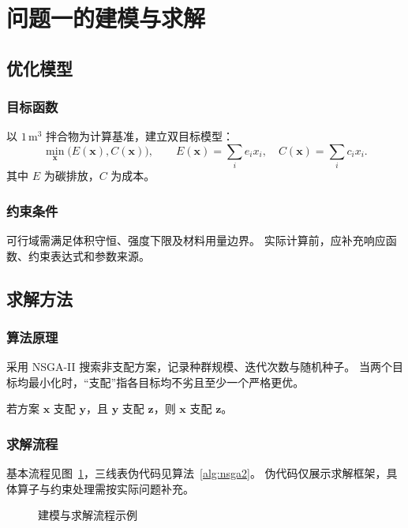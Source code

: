 \section{问题一的建模与求解}
\label{sec:problem1}
\subsection{优化模型}
\subsubsection{目标函数}
以 $1\,\mathrm{m^3}$ 拌合物为计算基准，建立双目标模型：
\begin{equation}
  \min_{\boldsymbol{x}}\bigl(E(\boldsymbol{x}),C(\boldsymbol{x})\bigr),
  \qquad E(\boldsymbol{x})=\sum_i e_i x_i,\quad
  C(\boldsymbol{x})=\sum_i c_i x_i.
  \label{eq:objectives}
\end{equation}
其中 $E$ 为碳排放，$C$ 为成本。

\subsubsection{约束条件}
可行域需满足体积守恒、强度下限及材料用量边界。
实际计算前，应补充响应函数、约束表达式和参数来源。

\subsection{求解方法}
\subsubsection{算法原理}
采用 NSGA-II 搜索非支配方案\citep{deb2002}，记录种群规模、迭代次数与随机种子。
当两个目标均最小化时，“支配”指各目标均不劣且至少一个严格更优。
\begin{theorem}[支配关系的传递性]
  若方案 $\boldsymbol{x}$ 支配 $\boldsymbol{y}$，且 $\boldsymbol{y}$ 支配
  $\boldsymbol{z}$，则 $\boldsymbol{x}$ 支配 $\boldsymbol{z}$。
\end{theorem}

\subsubsection{求解流程}
基本流程见图~\ref{fig:framework}，三线表伪代码见算法~\ref{alg:nsga2}。
伪代码仅展示求解框架，具体算子与约束处理需按实际问题补充。
\begin{figure}[htbp]
  \centering
  
  \caption{建模与求解流程示例}
  \label{fig:framework}
\end{figure}

